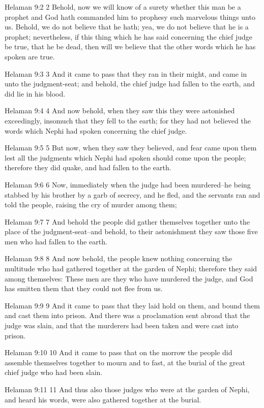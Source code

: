 Helaman 9:2
 2 Behold, now we will know of a surety whether this man be a
prophet and God hath commanded him to prophesy such marvelous
things unto us. Behold, we do not believe that he hath; yea, we
do not believe that he is a prophet; nevertheless, if this thing
which he has said concerning the chief judge be true, that he be
dead, then will we believe that the other words which he has
spoken are true.

Helaman 9:3
 3 And it came to pass that they ran in their might, and came in
unto the judgment-seat; and behold, the chief judge had fallen to
the earth, and did lie in his blood.

Helaman 9:4
 4 And now behold, when they saw this they were astonished
exceedingly, insomuch that they fell to the earth; for they had
not believed the words which Nephi had spoken concerning the
chief judge.

Helaman 9:5
 5 But now, when they saw they believed, and fear came upon them
lest all the judgments which Nephi had spoken should come upon
the people; therefore they did quake, and had fallen to the
earth.

Helaman 9:6
 6 Now, immediately when the judge had been murdered--he being
stabbed by his brother by a garb of secrecy, and he fled, and the
servants ran and told the people, raising the cry of murder among
them;

Helaman 9:7
 7 And behold the people did gather themselves together unto the
place of the judgment-seat--and behold, to their astonishment
they saw those five men who had fallen to the earth.

Helaman 9:8
 8 And now behold, the people knew nothing concerning the
multitude who had gathered together at the garden of Nephi;
therefore they said among themselves: These men are they who have
murdered the judge, and God has smitten them that they could not
flee from us.

Helaman 9:9
 9 And it came to pass that they laid hold on them, and bound
them and cast them into prison. And there was a proclamation
sent abroad that the judge was slain, and that the murderers had
been taken and were cast into prison.

Helaman 9:10
 10 And it came to pass that on the morrow the people did
assemble themselves together to mourn and to fast, at the burial
of the great chief judge who had been slain.

Helaman 9:11
 11 And thus also those judges who were at the garden of Nephi,
and heard his words, were also gathered together at the burial.

